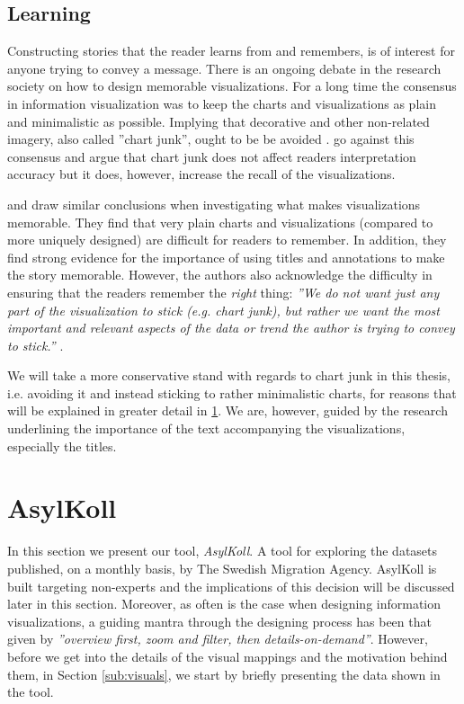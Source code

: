 \documentclass{acmtog} %
\begin{document}
\subsection{Learning}
\label{sub:learning}
Constructing stories that the reader learns from and remembers, is of interest for anyone trying to convey a message. There is an ongoing debate in the research society on how to design memorable visualizations. For a long time the consensus in information visualization was to keep the charts and visualizations as plain and minimalistic as possible. Implying that decorative and other non-related imagery, also called ''chart junk'', ought to be be avoided \cite{tufte1983visual}. \citet{bateman2010useful} go against this consensus and argue that chart junk does not affect readers interpretation accuracy but it does, however, increase the recall of the visualizations. 

\citet{borkin2013makes} and \citet{borkin2016beyond} draw similar conclusions when investigating what makes visualizations memorable. They find that very plain charts and visualizations (compared to more uniquely designed) are difficult for readers to remember. In addition, they find strong evidence for the importance of using titles and annotations to make the story memorable. However, the authors also acknowledge the difficulty in ensuring that the readers remember the \emph{right} thing: \emph{''We do not want just any part of the visualization to stick (e.g. chart junk), but rather we want the most important and relevant aspects of the data or trend the author is trying to convey to stick.''} \cite{borkin2013makes}.

We will take a more conservative stand with regards to chart junk in this thesis, i.e. avoiding it and instead sticking to rather minimalistic charts, for reasons that will be explained in greater detail in \ref{sec:tool}. We are, however, guided by the research underlining the importance of the text accompanying the visualizations, especially the titles.

\section{AsylKoll}
\label{sec:tool}
In this section we present our tool, \emph{AsylKoll}. A tool for exploring the datasets published, on a monthly basis, by The Swedish Migration Agency. AsylKoll is built targeting non-experts and the implications of this decision will be discussed later in this section. Moreover, as often is the case when designing information visualizations, a guiding mantra through the designing process has been that given by \citet{shneiderman1996eyes} \emph{''overview first, zoom and filter, then details-on-demand''}. However, before we get into the details of the visual mappings and the motivation behind them, in Section \ref{sub:visuals}, we start by briefly presenting the data shown in the tool.
\end{document}
